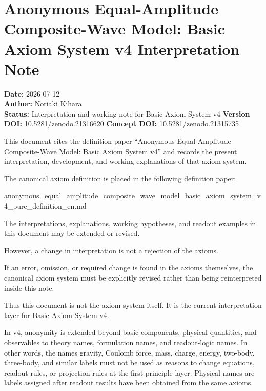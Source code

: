 \documentclass[
  a4paper,
]{article}
\author{}
\date{}
\newenvironment{Shaded}{}{}
\newcommand{\NormalTok}[1]{#1}
\begin{document}
\section{Anonymous Equal-Amplitude Composite-Wave Model: Basic Axiom
System v4 Interpretation
Note}\label{anonymous-equal-amplitude-composite-wave-model-basic-axiom-system-v4-interpretation-note}

\textbf{Date:} 2026-07-12\\
\textbf{Author:} Noriaki Kihara\\
\textbf{Status:} Interpretation and working note for Basic Axiom System
v4 \textbf{Version DOI:} 10.5281/zenodo.21316620 \textbf{Concept DOI:}
10.5281/zenodo.21315735

This document cites the definition paper ``Anonymous Equal-Amplitude
Composite-Wave Model: Basic Axiom System v4'' and records the present
interpretation, development, and working explanations of that axiom
system.

The canonical axiom definition is placed in the following definition
paper:

\begin{Shaded}
\begin{Highlighting}[]
\NormalTok{anonymous\_equal\_amplitude\_composite\_wave\_model\_basic\_axiom\_system\_v4\_pure\_definition\_en.md}
\end{Highlighting}
\end{Shaded}

The interpretations, explanations, working hypotheses, and readout
examples in this document may be extended or revised.

However, a change in interpretation is not a rejection of the axioms.

If an error, omission, or required change is found in the axioms
themselves, the canonical axiom system must be explicitly revised rather
than being reinterpreted inside this note.

Thus this document is not the axiom system itself. It is the current
interpretation layer for Basic Axiom System v4.

In v4, anonymity is extended beyond basic components, physical
quantities, and observables to theory names, formulation names, and
readout-logic names. In other words, the names gravity, Coulomb force,
mass, charge, energy, two-body, three-body, and similar labels must not
be used as reasons to change equations, readout rules, or projection
rules at the first-principle layer. Physical names are labels assigned
after readout results have been obtained from the same axioms.
\end{document}
